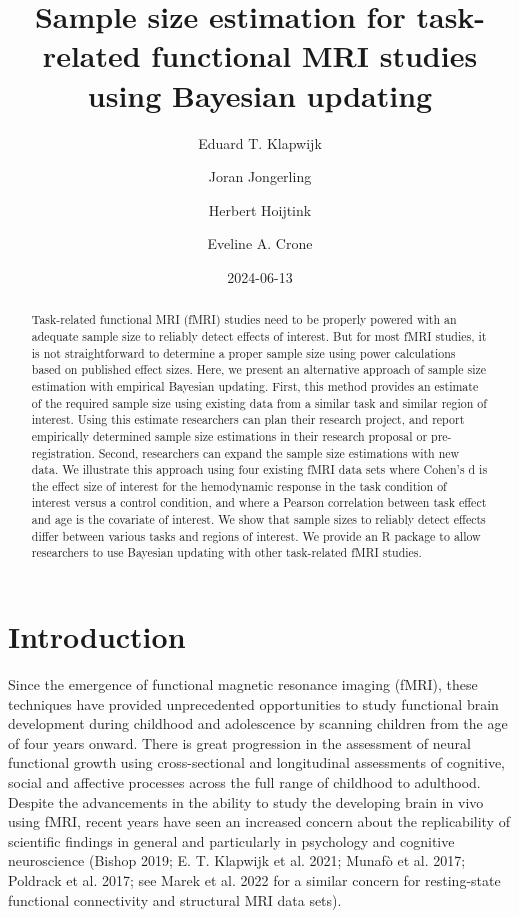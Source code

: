 \documentclass[
  letterpaper,
  DIV=11,
  numbers=noendperiod]{scrartcl}
\title{Sample size estimation for task-related functional MRI studies
using Bayesian updating}
\author{Eduard T. Klapwijk \and Joran Jongerling \and Herbert
Hoijtink \and Eveline A. Crone}
\date{2024-06-13}
\begin{document}
\maketitle
\begin{abstract}
Task-related functional MRI (fMRI) studies need to be properly powered
with an adequate sample size to reliably detect effects of interest. But
for most fMRI studies, it is not straightforward to determine a proper
sample size using power calculations based on published effect sizes.
Here, we present an alternative approach of sample size estimation with
empirical Bayesian updating. First, this method provides an estimate of
the required sample size using existing data from a similar task and
similar region of interest. Using this estimate researchers can plan
their research project, and report empirically determined sample size
estimations in their research proposal or pre-registration. Second,
researchers can expand the sample size estimations with new data. We
illustrate this approach using four existing fMRI data sets where
Cohen's d is the effect size of interest for the hemodynamic response in
the task condition of interest versus a control condition, and where a
Pearson correlation between task effect and age is the covariate of
interest. We show that sample sizes to reliably detect effects differ
between various tasks and regions of interest. We provide an R package
to allow researchers to use Bayesian updating with other task-related
fMRI studies.
\end{abstract}

\section{Introduction}\label{introduction}

Since the emergence of functional magnetic resonance imaging (fMRI),
these techniques have provided unprecedented opportunities to study
functional brain development during childhood and adolescence by
scanning children from the age of four years onward. There is great
progression in the assessment of neural functional growth using
cross-sectional and longitudinal assessments of cognitive, social and
affective processes across the full range of childhood to adulthood.
Despite the advancements in the ability to study the developing brain in
vivo using fMRI, recent years have seen an increased concern about the
replicability of scientific findings in general and particularly in
psychology and cognitive neuroscience (Bishop 2019; E. T. Klapwijk et
al. 2021; Munafò et al. 2017; Poldrack et al. 2017; see Marek et al.
2022 for a similar concern for resting-state functional connectivity and
structural MRI data sets).
\end{document}
